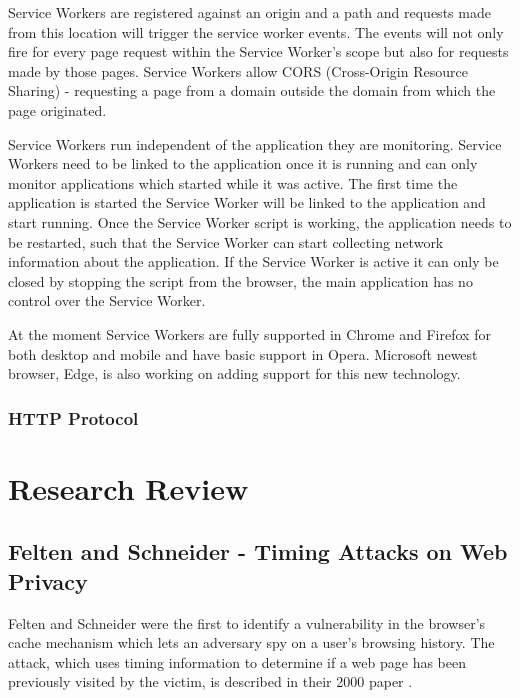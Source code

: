 \documentclass[10pt,a4paper,twoside]{book}
\begin{document}
Service Workers are registered against an origin and a path and requests made from this location will trigger the service worker events. The events will not only fire for every page request within the Service Worker's scope but also for requests made by those pages. Service Workers allow CORS (Cross-Origin Resource Sharing) - requesting a page from a domain outside the domain from which the page originated.

Service Workers run independent of the application they are monitoring. Service Workers need to be linked to the application once it is running and can only monitor applications which started while it was active. The first time the application is started the Service Worker will be linked to the application and start running. Once the Service Worker script is working, the application needs to be restarted, such that the Service Worker can start collecting network information about the application. If the Service Worker is active it can only be closed by stopping the script from the browser, the main application has no control over the Service Worker.

At the moment Service Workers are fully supported in Chrome and Firefox for both desktop and mobile and have basic support in Opera. Microsoft newest browser, Edge, is also working on adding support for this new technology.

\subsection{HTTP Protocol}



\chapter{Research Review}
\label{chap:realtedWork}

\section{Felten and Schneider - Timing Attacks on Web Privacy}
\label{feltenschneider}
Felten and Schneider were the first to identify a vulnerability in the browser's cache mechanism which lets an adversary spy on a user's browsing history. The attack, which uses timing information to determine if a web page has been previously visited by the victim, is described in their 2000 paper \cite{felten2000timing}.
\end{document}
